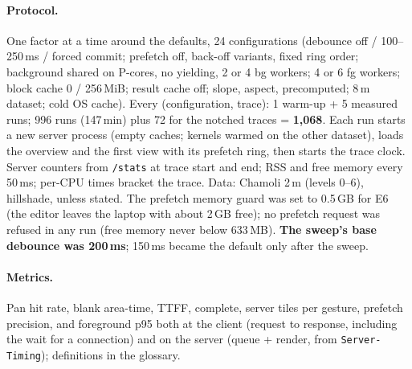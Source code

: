 ﻿\documentclass[11pt,a4paper]{article}
\newcommand{\code}[1]{\texttt{#1}}
\begin{document}
\paragraph{Protocol.} One factor at a time around the defaults, 24 configurations (debounce off / 100--250\,ms /
forced commit; prefetch off, back-off variants, fixed ring order; background shared on P-cores, no yielding, 2 or 4 bg
workers; 4 or 6 fg workers; block cache 0 / 256\,MiB; result cache off; slope, aspect, precomputed; 8\,m dataset;
cold OS cache). Every (configuration, trace): 1 warm-up + 5 measured runs; 996 runs (147\,min) plus 72 for the notched
traces = \textbf{1{,}068}. Each run starts a new server process (empty caches; kernels warmed on the other dataset),
loads the overview and the first view with its prefetch ring, then starts the trace clock. Server counters from
\code{/stats} at trace start and end; RSS and free memory every 50\,ms; per-CPU times bracket the trace. Data: Chamoli
2\,m (levels 0--6), hillshade, unless stated. The prefetch memory guard was set to 0.5\,GB for E6 (the editor leaves
the laptop with about 2\,GB free); no prefetch request was refused in any run (free memory never below 633\,MB).
\textbf{The sweep's base debounce was 200\,ms}; 150\,ms became the default only after the sweep.

\paragraph{Metrics.} Pan hit rate, blank area-time, TTFF, complete, server tiles per gesture, prefetch precision, and
foreground p95 both at the client (request to response, including the wait for a connection) and on the server (queue
+ render, from \code{Server-Timing}); definitions in the glossary.
\end{document}
